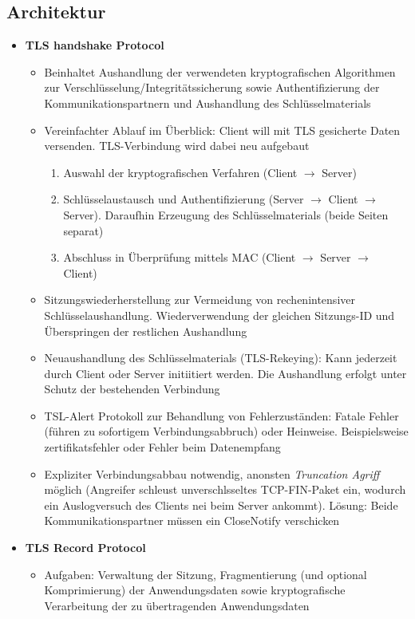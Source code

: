 \subsection{Architektur}
\begin{itemize}
	\item \textbf{TLS handshake Protocol}
	\begin{itemize}
		\item Beinhaltet Aushandlung der verwendeten kryptografischen Algorithmen zur Verschlüsselung/Integritätssicherung sowie Authentifizierung der Kommunikationspartnern und Aushandlung des Schlüsselmaterials
		\item Vereinfachter Ablauf im Überblick: Client will mit TLS gesicherte Daten versenden. TLS-Verbindung wird dabei neu aufgebaut
		\begin{enumerate}
			\item Auswahl der kryptografischen Verfahren (Client \(\rightarrow\) Server)
			\item Schlüsselaustausch und Authentifizierung (Server \(\rightarrow\) Client \(\rightarrow\) Server). Daraufhin Erzeugung des Schlüsselmaterials (beide Seiten separat)
			\item Abschluss in Überprüfung mittels MAC (Client \(\rightarrow\) Server \(\rightarrow\) Client)
		\end{enumerate}
		\item Sitzungswiederherstellung zur Vermeidung von rechenintensiver Schlüsselaushandlung. Wiederverwendung der gleichen Sitzungs-ID und Überspringen der restlichen Aushandlung
		\item Neuaushandlung des Schlüsselmaterials (TLS-Rekeying): Kann jederzeit durch Client oder Server initiitiert werden. Die Aushandlung erfolgt unter Schutz der bestehenden Verbindung
		\item TSL-Alert Protokoll zur Behandlung von Fehlerzuständen: Fatale Fehler (führen zu sofortigem Verbindungsabbruch) oder Heinweise. Beispielsweise zertifikatsfehler oder Fehler beim Datenempfang
		\item Expliziter Verbindungsabbau notwendig, anonsten \textit{Truncation Agriff} möglich (Angreifer schleust unverschlsseltes TCP-FIN-Paket ein, wodurch ein Auslogversuch des Clients nei beim Server ankommt). Lösung: Beide Kommunikationspartner müssen ein CloseNotify verschicken
	\end{itemize}
	\item \textbf{TLS Record Protocol}
	\begin{itemize}
		\item Aufgaben: Verwaltung der Sitzung, Fragmentierung (und optional Komprimierung) der Anwendungsdaten sowie kryptografische Verarbeitung der zu übertragenden Anwendungsdaten

\end{itemize}
\end{itemize}
